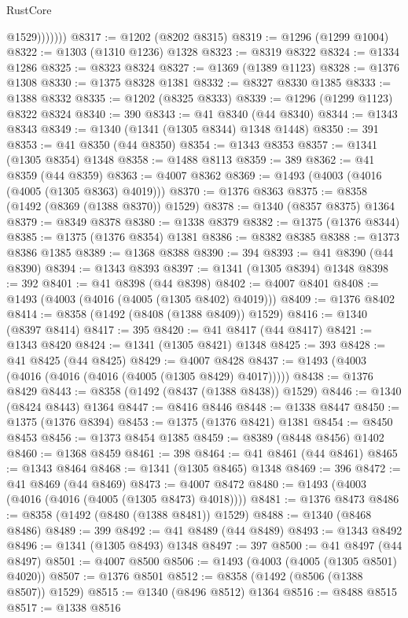 \begin{lexlean}{RustCore}
\begin{coremodule}
                  @1529)))))))
@8317 := @1202 (@8202 @8315)
@8319 := @1296 (@1299 @1004)
@8322 := @1303 (@1310 @1236) @1328
@8323 := @8319 @8322
@8324 := @1334 @1286
@8325 := @8323 @8324
@8327 := @1369 (@1389 @1123)
@8328 := @1376 @1308
@8330 := @1375 @8328 @1381
@8332 := @8327 @8330 @1385
@8333 := @1388 @8332
@8335 := @1202 (@8325 @8333)
@8339 := @1296 (@1299 @1123) @8322 @8324
@8340 := 390
@8343 := @41 @8340 (@44 @8340)
@8344 := @1343 @8343
@8349 := @1340 (@1341 (@1305 @8344) @1348 @1448)
@8350 := 391
@8353 := @41 @8350 (@44 @8350)
@8354 := @1343 @8353
@8357 := @1341 (@1305 @8354) @1348
@8358 := @1488 @8113
@8359 := 389
@8362 := @41 @8359 (@44 @8359)
@8363 := @4007 @8362
@8369 := @1493 (@4003 (@4016 (@4005 (@1305 @8363) @4019)))
@8370 := @1376 @8363
@8375 := @8358 (@1492 (@8369 (@1388 @8370)) @1529)
@8378 := @1340 (@8357 @8375) @1364
@8379 := @8349 @8378
@8380 := @1338 @8379
@8382 := @1375 (@1376 @8344)
@8385 := @1375 (@1376 @8354) @1381
@8386 := @8382 @8385
@8388 := @1373 @8386 @1385
@8389 := @1368 @8388
@8390 := 394
@8393 := @41 @8390 (@44 @8390)
@8394 := @1343 @8393
@8397 := @1341 (@1305 @8394) @1348
@8398 := 392
@8401 := @41 @8398 (@44 @8398)
@8402 := @4007 @8401
@8408 := @1493 (@4003 (@4016 (@4005 (@1305 @8402) @4019)))
@8409 := @1376 @8402
@8414 := @8358 (@1492 (@8408 (@1388 @8409)) @1529)
@8416 := @1340 (@8397 @8414)
@8417 := 395
@8420 := @41 @8417 (@44 @8417)
@8421 := @1343 @8420
@8424 := @1341 (@1305 @8421) @1348
@8425 := 393
@8428 := @41 @8425 (@44 @8425)
@8429 := @4007 @8428
@8437 := @1493 (@4003 (@4016 (@4016 (@4016 (@4005 (@1305 @8429) @4017)))))
@8438 := @1376 @8429
@8443 := @8358 (@1492 (@8437 (@1388 @8438)) @1529)
@8446 := @1340 (@8424 @8443) @1364
@8447 := @8416 @8446
@8448 := @1338 @8447
@8450 := @1375 (@1376 @8394)
@8453 := @1375 (@1376 @8421) @1381
@8454 := @8450 @8453
@8456 := @1373 @8454 @1385
@8459 := @8389 (@8448 @8456) @1402
@8460 := @1368 @8459
@8461 := 398
@8464 := @41 @8461 (@44 @8461)
@8465 := @1343 @8464
@8468 := @1341 (@1305 @8465) @1348
@8469 := 396
@8472 := @41 @8469 (@44 @8469)
@8473 := @4007 @8472
@8480 := @1493 (@4003 (@4016 (@4016 (@4005 (@1305 @8473) @4018))))
@8481 := @1376 @8473
@8486 := @8358 (@1492 (@8480 (@1388 @8481)) @1529)
@8488 := @1340 (@8468 @8486)
@8489 := 399
@8492 := @41 @8489 (@44 @8489)
@8493 := @1343 @8492
@8496 := @1341 (@1305 @8493) @1348
@8497 := 397
@8500 := @41 @8497 (@44 @8497)
@8501 := @4007 @8500
@8506 := @1493 (@4003 (@4005 (@1305 @8501) @4020))
@8507 := @1376 @8501
@8512 := @8358 (@1492 (@8506 (@1388 @8507)) @1529)
@8515 := @1340 (@8496 @8512) @1364
@8516 := @8488 @8515
@8517 := @1338 @8516

\end{coremodule}
\end{lexlean}
